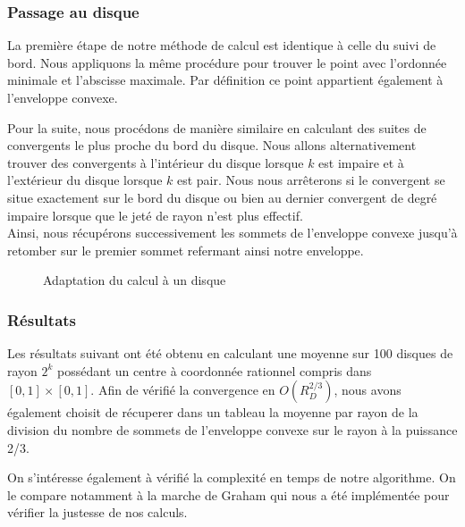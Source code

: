 
\subsubsection{Passage au disque}

La première étape de notre méthode de calcul est identique à celle du suivi de bord. Nous appliquons la même procédure pour trouver le point avec l'ordonnée minimale et l'abscisse maximale. Par définition ce point appartient également à l'enveloppe convexe. 

Pour la suite, nous procédons de manière similaire en calculant des suites de convergents le plus proche du bord du disque. Nous allons alternativement trouver des convergents à l'intérieur du disque lorsque $k$ est impaire et à l'extérieur du disque lorsque $k$ est pair. Nous nous arrêterons si le convergent se situe exactement sur le bord du disque ou bien au dernier convergent de degré impaire lorsque que le jeté de rayon n'est plus effectif.\\

Ainsi, nous récupérons successivement les sommets de l'enveloppe convexe jusqu'à retomber sur le premier sommet refermant ainsi notre enveloppe.

\begin{figure}[h!]
  \centering
  \caption{Adaptation du calcul à un disque}
\end{figure}

\subsubsection{Résultats}

Les résultats suivant ont été obtenu en calculant une moyenne sur 100 disques de rayon $2^k$ possédant un centre à coordonnée rationnel compris dans $[0,1]\times[0,1]$. Afin de vérifié la convergence en $O(R_{D}^{2/3})$, nous avons également choisit de récuperer dans un tableau la moyenne par rayon de la division du nombre de sommets de l'enveloppe convexe sur le rayon à la puissance 2/3.

On s'intéresse également à vérifié la complexité en temps de notre algorithme. On le compare notamment à la marche de Graham qui nous a été implémentée pour vérifier la justesse de nos calculs. 

